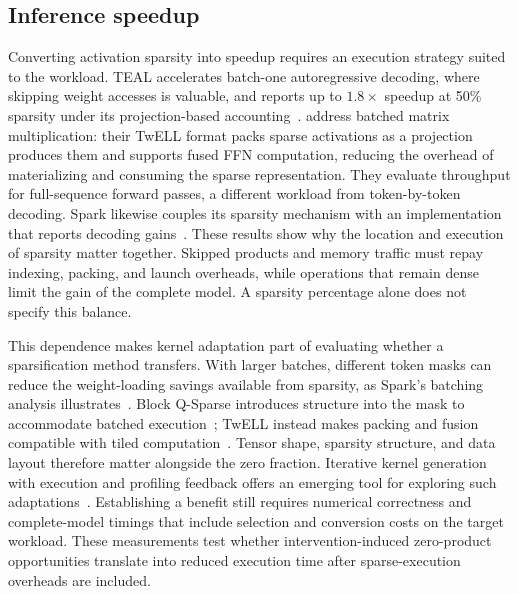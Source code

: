 \subsection{Inference speedup}
\label{sec:related-speedup}

Converting activation sparsity into speedup requires an execution strategy
suited to the workload. TEAL accelerates batch-one autoregressive decoding,
where skipping weight accesses is valuable, and reports up to $1.8\times$
speedup at 50\% sparsity under its projection-based
accounting~\citep{liu2024teal}.
\citet{cetin2026sparser} address batched matrix multiplication: their TwELL
format packs sparse activations as a projection produces them and supports
fused FFN computation, reducing the overhead of materializing and consuming
the sparse representation. They evaluate throughput for full-sequence forward
passes, a different workload from token-by-token decoding. Spark likewise couples its
sparsity mechanism with an implementation that reports decoding
gains~\citep{you2025spark}. These results show why the location and execution
of sparsity matter together. Skipped products and memory traffic must repay
indexing, packing, and launch overheads, while operations that remain dense
limit the gain of the complete model. A sparsity percentage alone does not
specify this balance.

This dependence makes kernel adaptation part of evaluating whether a
sparsification method transfers. With larger batches, different token masks
can reduce the weight-loading savings available from sparsity, as Spark's
batching analysis illustrates~\citep{you2025spark}. Block Q-Sparse introduces
structure into the mask to accommodate batched
execution~\citep{wang2024qsparse}; TwELL instead makes packing and fusion
compatible with tiled computation~\citep{cetin2026sparser}. Tensor shape,
sparsity structure, and data layout therefore matter alongside the zero
fraction. Iterative kernel generation with execution and profiling feedback
offers an emerging tool for exploring such
adaptations~\citep{ouyang2025kernelbench,luo2026agentic}.
Establishing a benefit still requires numerical correctness and complete-model
timings that include selection and conversion costs on the target workload.
These measurements test whether intervention-induced zero-product
opportunities translate into reduced execution time after sparse-execution
overheads are included.
